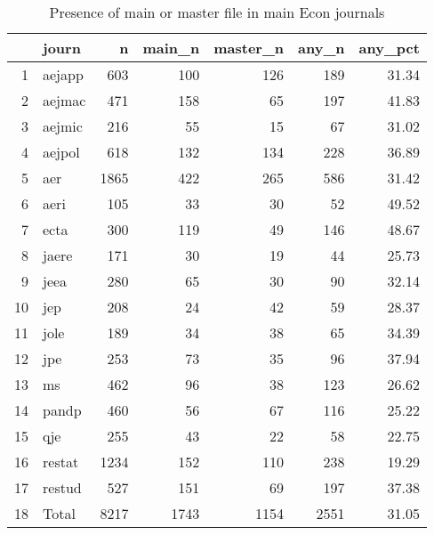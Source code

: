\begin{table}[ht]
\centering
\caption{Presence of main or master file in main Econ journals} 
\label{tab:master:byjournal}
\begin{tabular}{rlrrrrr}
  \hline
 & journ & n & main\_n & master\_n & any\_n & any\_pct \\ 
  \hline
1 & aejapp & 603 & 100 & 126 & 189 & 31.34 \\ 
  2 & aejmac & 471 & 158 &  65 & 197 & 41.83 \\ 
  3 & aejmic & 216 &  55 &  15 &  67 & 31.02 \\ 
  4 & aejpol & 618 & 132 & 134 & 228 & 36.89 \\ 
  5 & aer & 1865 & 422 & 265 & 586 & 31.42 \\ 
  6 & aeri & 105 &  33 &  30 &  52 & 49.52 \\ 
  7 & ecta & 300 & 119 &  49 & 146 & 48.67 \\ 
  8 & jaere & 171 &  30 &  19 &  44 & 25.73 \\ 
  9 & jeea & 280 &  65 &  30 &  90 & 32.14 \\ 
  10 & jep & 208 &  24 &  42 &  59 & 28.37 \\ 
  11 & jole & 189 &  34 &  38 &  65 & 34.39 \\ 
  12 & jpe & 253 &  73 &  35 &  96 & 37.94 \\ 
  13 & ms & 462 &  96 &  38 & 123 & 26.62 \\ 
  14 & pandp & 460 &  56 &  67 & 116 & 25.22 \\ 
  15 & qje & 255 &  43 &  22 &  58 & 22.75 \\ 
  16 & restat & 1234 & 152 & 110 & 238 & 19.29 \\ 
  17 & restud & 527 & 151 &  69 & 197 & 37.38 \\ 
  18 & Total & 8217 & 1743 & 1154 & 2551 & 31.05 \\ 
   \hline
\end{tabular}
\end{table}
